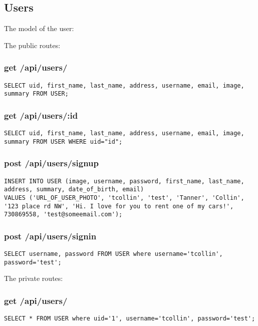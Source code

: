 \documentclass{article}
\begin{document}
\subsection{Users}
The model of the user:

The public routes:
\subsubsection{get /api/users/}
\begin{lstlisting}
SELECT uid, first_name, last_name, address, username, email, image, summary FROM USER;
\end{lstlisting}
\subsubsection{get /api/users/:id}
\begin{lstlisting}
SELECT uid, first_name, last_name, address, username, email, image, summary FROM USER WHERE uid="id";
\end{lstlisting}

\subsubsection{post /api/users/signup}
\begin{lstlisting}
INSERT INTO USER (image, username, password, first_name, last_name, address, summary, date_of_birth, email)
VALUES ('URL_OF_USER_PHOTO', 'tcollin', 'test', 'Tanner', 'Collin', '123 place rd NW', 'Hi. I love for you to rent one of my cars!', 730869558, 'test@someemail.com');
\end{lstlisting}

\subsubsection{post /api/users/signin}
\begin{lstlisting}
SELECT username, password FROM USER where username='tcollin', password='test';
\end{lstlisting}
The private routes:

\subsubsection{get /api/users/}
\begin{lstlisting}
SELECT * FROM USER where uid='1', username='tcollin', password='test';
\end{lstlisting}
\end{document}

